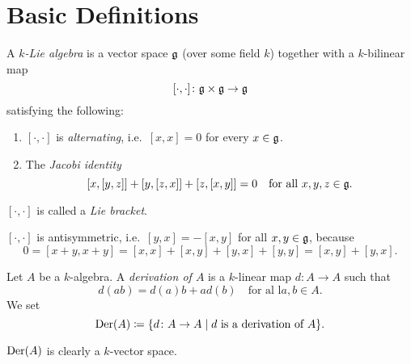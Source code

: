 \section{Basic Definitions}


\begin{defi}
 A \emph{$k$-Lie algebra} is a vector space $\mathfrak{g}$ (over some field $k$) together with a $k$-bilinear map
 \[
  [\cdot, \cdot] \colon \mathfrak{g} \times \mathfrak{g} \to \mathfrak{g}
 \]
 satisfying the following:
 \begin{enumerate}
  \item
   $[\cdot, \cdot]$ is \emph{alternating}, i.e.\ $[x,x] = 0$ for every $x \in \mathfrak{g}$.
  \item
   The \emph{Jacobi identity}
   \[
    [x,[y,z]] + [y,[z,x]] + [z,[x,y]] = 0
    \quad
    \text{for all $x,y,z \in \mathfrak{g}$}.
   \]
 \end{enumerate}
 $[\cdot,\cdot]$ is called a \emph{Lie bracket}.
\end{defi}


\begin{rem}
 $[\cdot, \cdot]$ is antisymmetric, i.e.\ $[y,x] = -[x,y]$ for all $x,y \in \mathfrak{g}$, because
 \[
  0 = [x+y, x+y] = [x,x] + [x,y] + [y,x] + [y,y] = [x,y] + [y,x].
 \]
\end{rem}


\begin{defi}
 Let $A$ be a $k$-algebra. A \emph{derivation of $A$} is a $k$-linear map $d \colon A \to A$ such that
 \[
  d(ab) = d(a)b + ad(b) \quad \text{for al l$a,b \in A$}.
 \]
 We set
 \[
  \operatorname{Der}(A) \coloneqq \{d \colon A \to A \mid \text{$d$ is a derivation of $A$} \}.
 \]
\end{defi}


\begin{rem}
 $\operatorname{Der}(A)$ is clearly a $k$-vector space.
\end{rem}


